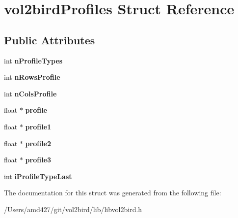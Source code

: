 \hypertarget{structvol2birdProfiles}{}\section{vol2bird\+Profiles Struct Reference}
\label{structvol2birdProfiles}
\subsection*{Public Attributes}
\begin{DoxyCompactItemize}
\item 
\mbox{\label{structvol2birdProfiles_a63e3b40e9e0d645bbe09f60b39b6be55}} 
int {\bfseries n\+Profile\+Types}
\item 
\mbox{\label{structvol2birdProfiles_a88d7d3d9b270c25751edb491749a3c6f}} 
int {\bfseries n\+Rows\+Profile}
\item 
\mbox{\label{structvol2birdProfiles_a2bc0c137d022613436618f1a943c3c88}} 
int {\bfseries n\+Cols\+Profile}
\item 
\mbox{\label{structvol2birdProfiles_afee6104062c88771ca537953ff9f6ca1}} 
float $\ast$ {\bfseries profile}
\item 
\mbox{\label{structvol2birdProfiles_aad02a6649c4ec8d3c72d7079eba5116b}} 
float $\ast$ {\bfseries profile1}
\item 
\mbox{\label{structvol2birdProfiles_aae276850ef7316e53bacfe22514fc2f6}} 
float $\ast$ {\bfseries profile2}
\item 
\mbox{\label{structvol2birdProfiles_a747ece3ac707b8999ea9ffa06ded71d9}} 
float $\ast$ {\bfseries profile3}
\item 
\mbox{\label{structvol2birdProfiles_a913d0151b4a07c3b8a9e8dd96ec3d978}} 
int {\bfseries i\+Profile\+Type\+Last}
\end{DoxyCompactItemize}


The documentation for this struct was generated from the following file\+:\begin{DoxyCompactItemize}
\item 
/\+Users/amd427/git/vol2bird/lib/libvol2bird.\+h\end{DoxyCompactItemize}
